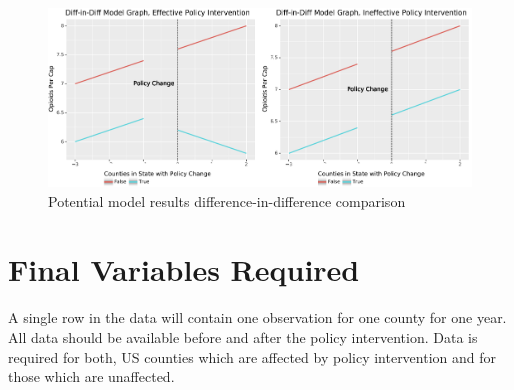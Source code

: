 \documentclass[12pt]{article}
\begin{document}
\begin{figure}[h]
    \centering
    \includegraphics[scale=.5]{41_project_strategy_potential_model_results_did.png}
    \caption{Potential model results difference-in-difference comparison }
    \label{fig:did}
\end{figure}



\vspace*{1cm}
\section{Final Variables Required}




A single row in the data will contain one observation for one county for one year. All data should be available before and after the policy intervention. Data is required for both, US counties which are affected by policy intervention and for those which are unaffected. 
\end{document}
